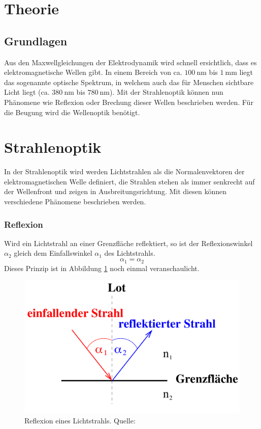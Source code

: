 \section{Theorie}
\label{sec:Theorie}

\subsection{Grundlagen}
\label{sec:grundlagen}
Aus den Maxwellgleichungen der Elektrodynamik wird schnell ersichtlich, dass es elektromagnetische Wellen
gibt. In einem Bereich von ca. $\SI{100}{\nano\metre}$ bis $\SI{1}{\milli\metre}$ liegt das sogenannte
optische Spektrum, in welchem auch das für Menschen sichtbare Licht liegt (ca. $\SI{380}{\nano\metre}$
bis $\SI{780}{\nano\metre}$). Mit der Strahlenoptik \label{sec:strahlen} können nun Phänomene wie Reflexion oder Brechung 
dieser Wellen beschrieben werden. Für die Beugung wird die Wellenoptik \label{sec:welle} benötigt.
\section{Strahlenoptik}
In der Strahlenoptik wird werden Lichtstrahlen als die Normalenvektoren der elektromagnetischen Welle 
definiert, die Strahlen stehen als immer senkrecht auf der Wellenfront und zeigen in Ausbreitungsrichtung.
Mit diesen können verschiedene Phänomene beschrieben werden. 

\subsubsection*{Reflexion}
\label{sec:reflexion}
Wird ein Lichtstrahl an einer Grenzfläche reflektiert, so ist der Reflexionswinkel $\alpha_2$ gleich dem
Einfallswinkel $\alpha_1$ des Lichtstrahls. 
\begin{equation}
    \alpha_1=\alpha_2
    \label{eqn:reflexion}
\end{equation}
Dieses Prinzip ist in Abbildung \ref{fig:reflexion} noch einmal veranschaulicht.
\begin{figure}[H]
    \centering
    \includegraphics[scale = 0.3]{pictures/Reflexion.png}
    \caption{Reflexion eines Lichtstrahls. Quelle: \cite{AP01}}
    \label{fig:reflexion}
\end{figure}

